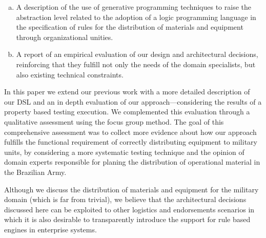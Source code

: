 \documentclass[twocolumn]{bmcart}%
\begin{document}
\begin{enumerate}[(a)] 

\item A description of the use of generative programming techniques to raise the abstraction level related to the adoption of a logic programming language in the specification of rules for the 	distribution of materials and equipment through organizational unities.

\item A report of an empirical evaluation of our design and architectural decisions, reinforcing that they fulfill not only the needs of the domain specialists, but also existing technical constraints. 	

\end{enumerate}


In this paper we extend our previous work with a more detailed description of our DSL and an in depth evaluation of our approach---considering the results of a property based testing execution. We complemented this evaluation through a qualitative assessment using the focus group method. The goal of this comprehensive assessment was to collect more evidence about how our approach fulfills the functional requirement of correctly distributing equipment to military units, by considering a more systematic testing technique and the opinion of domain experts responsible for planing the distribution of operational material in the Brazilian Army. 

Although we discuss the distribution of materials and equipment for the military domain (which is far from trivial), we believe that the architectural decisions discussed here can be exploited to other logistics and endorsements scenarios in which it is also desirable to transparently introduce the support for rule based engines in enterprise systems.

\end{document}
